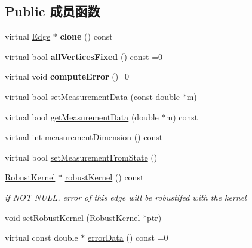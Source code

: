 \subsection*{Public 成员函数}
\begin{DoxyCompactItemize}
\item 
\hypertarget{classg2o_1_1OptimizableGraph_1_1Edge_a4f274bac9939144dd6b30578c5424a45}{virtual \hyperlink{classg2o_1_1OptimizableGraph_1_1Edge}{Edge} $\ast$ {\bfseries clone} () const }\label{classg2o_1_1OptimizableGraph_1_1Edge_a4f274bac9939144dd6b30578c5424a45}

\item 
\hypertarget{classg2o_1_1OptimizableGraph_1_1Edge_a414c69ca1617a4d3b620e39f2ffbcea7}{virtual bool {\bfseries all\-Vertices\-Fixed} () const =0}\label{classg2o_1_1OptimizableGraph_1_1Edge_a414c69ca1617a4d3b620e39f2ffbcea7}

\item 
\hypertarget{classg2o_1_1OptimizableGraph_1_1Edge_a1e6d9f4128866982de5e11e03edd7775}{virtual void {\bfseries compute\-Error} ()=0}\label{classg2o_1_1OptimizableGraph_1_1Edge_a1e6d9f4128866982de5e11e03edd7775}

\item 
virtual bool \hyperlink{classg2o_1_1OptimizableGraph_1_1Edge_ae8d99a85921057eba87a2346ba9c6e0a}{set\-Measurement\-Data} (const double $\ast$m)
\item 
virtual bool \hyperlink{classg2o_1_1OptimizableGraph_1_1Edge_a5f7c64421d33b7deb8fcfd5f4cf172b8}{get\-Measurement\-Data} (double $\ast$m) const 
\item 
virtual int \hyperlink{classg2o_1_1OptimizableGraph_1_1Edge_a44bd732330859991d4fbc992129b2e79}{measurement\-Dimension} () const 
\item 
virtual bool \hyperlink{classg2o_1_1OptimizableGraph_1_1Edge_a2f0b6465d6cd8b459ebc6494892c44f4}{set\-Measurement\-From\-State} ()
\item 
\hypertarget{classg2o_1_1OptimizableGraph_1_1Edge_aeb6ce9f3bf7b896f58272ea0d3feb8ff}{\hyperlink{classg2o_1_1RobustKernel}{Robust\-Kernel} $\ast$ \hyperlink{classg2o_1_1OptimizableGraph_1_1Edge_aeb6ce9f3bf7b896f58272ea0d3feb8ff}{robust\-Kernel} () const }\label{classg2o_1_1OptimizableGraph_1_1Edge_aeb6ce9f3bf7b896f58272ea0d3feb8ff}

\begin{DoxyCompactList}\small\item\em if N\-O\-T N\-U\-L\-L, error of this edge will be robustifed with the kernel \end{DoxyCompactList}\item 
void \hyperlink{classg2o_1_1OptimizableGraph_1_1Edge_a42955172c19f16e2cfbb30d611d1bd87}{set\-Robust\-Kernel} (\hyperlink{classg2o_1_1RobustKernel}{Robust\-Kernel} $\ast$ptr)
\item 
\hypertarget{classg2o_1_1OptimizableGraph_1_1Edge_a5f2a4b6efa2d0ae600f94a28a6ba58cf}{virtual const double $\ast$ \hyperlink{classg2o_1_1OptimizableGraph_1_1Edge_a5f2a4b6efa2d0ae600f94a28a6ba58cf}{error\-Data} () const =0}\label{classg2o_1_1OptimizableGraph_1_1Edge_a5f2a4b6efa2d0ae600f94a28a6ba58cf}


\end{DoxyCompactItemize}
